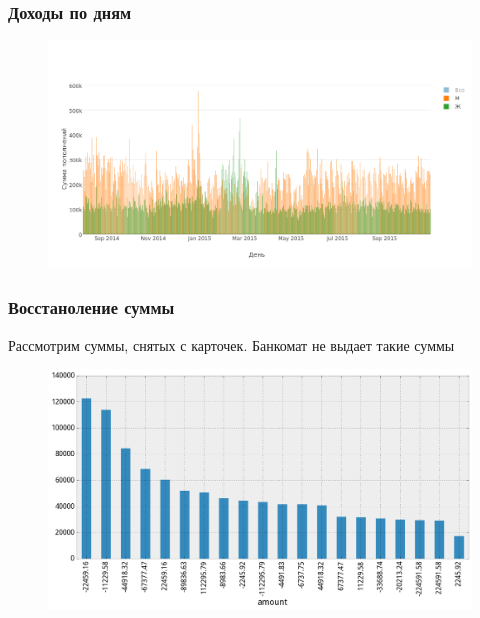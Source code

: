 \documentclass{beamer}
\begin{document}
\begin{frame}
\frametitle{Доходы по дням}

\begin{figure}
    \includegraphics[width=1\linewidth]{pics/plus.png}
\end{figure}

\end{frame}


\begin{frame}
\frametitle{Восстаноление суммы}

Рассмотрим суммы, снятых с карточек. Банкомат не выдает такие суммы

\begin{figure}
    \includegraphics[width=1\linewidth]{pics/amount_count.png}
\end{figure}

\end{frame}

\end{document}
